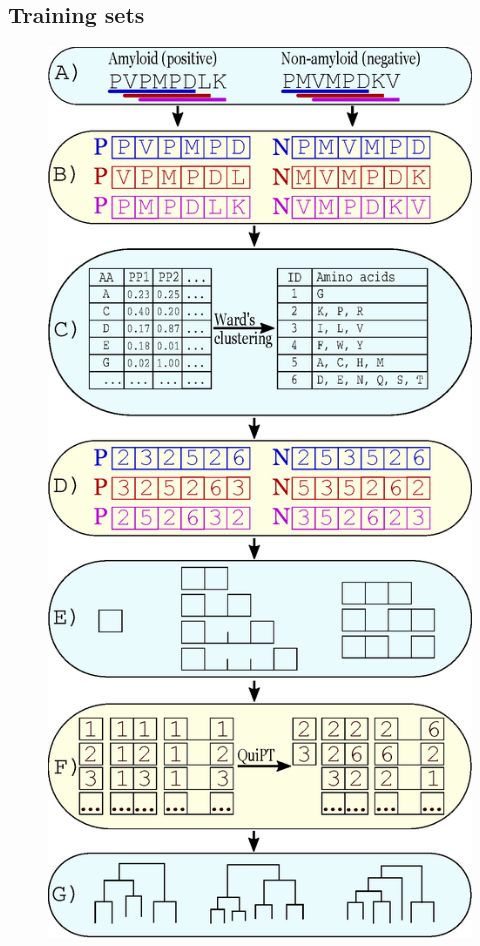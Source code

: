 \documentclass[a4,center,fleqn]{NAR}
\begin{document}
\subsection{Training sets}

\begin{figure} 
\centerline{\includegraphics[width=\columnwidth]{figures/ngram_scheme.eps}} 

\end{figure}
\end{document}
